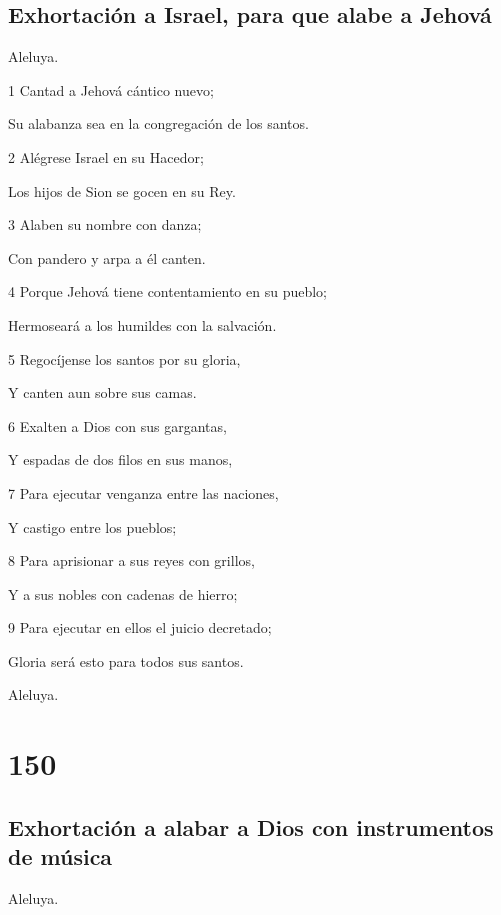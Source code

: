 \section*{Exhortación a Israel, para que alabe a Jehová}

\par Aleluya.

\par 1 Cantad a Jehová cántico nuevo;
\par Su alabanza sea en la congregación de los santos.
\par 2 Alégrese Israel en su Hacedor;
\par Los hijos de Sion se gocen en su Rey.
\par 3 Alaben su nombre con danza;
\par Con pandero y arpa a él canten.
\par 4 Porque Jehová tiene contentamiento en su pueblo;
\par Hermoseará a los humildes con la salvación.
\par 5 Regocíjense los santos por su gloria,
\par Y canten aun sobre sus camas.
\par 6 Exalten a Dios con sus gargantas,
\par Y espadas de dos filos en sus manos,
\par 7 Para ejecutar venganza entre las naciones,
\par Y castigo entre los pueblos;
\par 8 Para aprisionar a sus reyes con grillos,
\par Y a sus nobles con cadenas de hierro;
\par 9 Para ejecutar en ellos el juicio decretado;
\par Gloria será esto para todos sus santos.
\par Aleluya.

\chapter{150}

\section*{Exhortación a alabar a Dios con instrumentos de música}

\par Aleluya.

